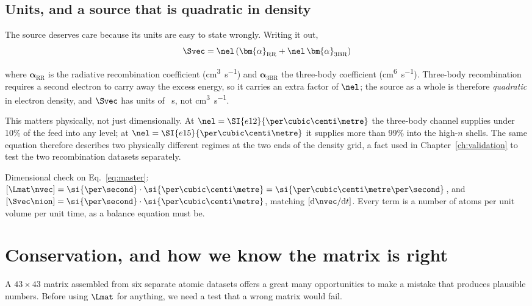 \subsection{Units, and a source that is quadratic in density}

The source deserves care because its units are easy to state wrongly. Writing
it out,
\begin{equation}
  \Svec = \nel\left(\bm{\alpha}_{\mathrm{RR}}
        + \nel\,\bm{\alpha}_{\mathrm{3BR}}\right)
  \label{eq:source}
\end{equation}

\noindent where $\bm{\alpha}_{\mathrm{RR}}$ is the radiative recombination
coefficient (\si{\cubic\centi\metre\per\second}) and
$\bm{\alpha}_{\mathrm{3BR}}$ the three-body coefficient
(\si{\centi\metre\tothe{6}\per\second}). Three-body recombination requires a
second electron to carry away the excess energy, so it carries an extra factor
of $\nel$; the source as a whole is therefore \emph{quadratic} in electron
density, and $\Svec$ has units of \si{\per\second}, not
\si{\cubic\centi\metre\per\second}.

This matters physically, not just dimensionally. At $\nel = \SI{e12}{\per\cubic\centi\metre}$
the three-body channel supplies under 10\% of the feed into any level; at
$\nel = \SI{e15}{\per\cubic\centi\metre}$ it supplies more than 99\% into the
high-$n$ shells. The same equation therefore describes two physically different
regimes at the two ends of the density grid, a fact used in
Chapter~\ref{ch:validation} to test the two recombination datasets separately.

Dimensional check on Eq.~\eqref{eq:master}: $[\Lmat\nvec] =
\si{\per\second}\cdot\si{\per\cubic\centi\metre} =
\si{\per\cubic\centi\metre\per\second}$, and
$[\Svec\nion] = \si{\per\second}\cdot\si{\per\cubic\centi\metre}$, matching
$[\mathrm{d}\nvec/\mathrm{d}t]$. Every term is a number of atoms per unit volume
per unit time, as a balance equation must be.

\section{Conservation, and how we know the matrix is right}
\label{sec:conservation}

A $43\times43$ matrix assembled from six separate atomic datasets offers a great
many opportunities to make a mistake that produces plausible numbers. Before
using $\Lmat$ for anything, we need a test that a wrong matrix would fail.

